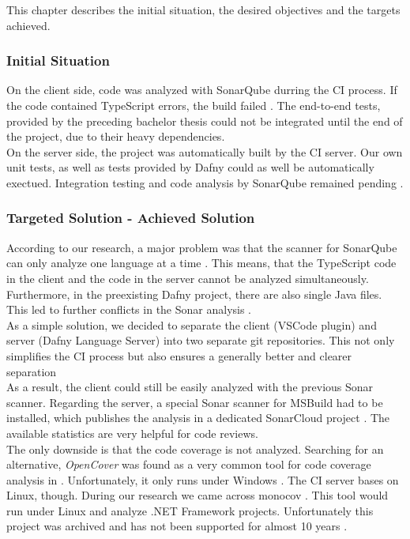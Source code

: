 This chapter describes the initial situation, the desired objectives and the targets achieved.

\subsubsection{Initial Situation}
On the client side, code was analyzed with SonarQube durring the CI process.
If the code contained TypeScript errors, the build failed \cite{sa}.
The end-to-end tests, provided by the preceding bachelor thesis\cite{ba} could not be integrated until the end of the project, due to their heavy dependencies.\\

On the server side, the project was automatically built by the CI server.
Our own unit tests, as well as tests provided by Dafny could as well be automatically exectued.
Integration testing and code analysis by SonarQube remained pending \cite{sa}.

\subsubsection{Targeted Solution - Achieved Solution}
According to our research, a major problem was that the scanner for SonarQube can only analyze one language at a time \cite{sonar-supports-only-one-language}.
This means, that the TypeScript code in the client and the \Csharp code in the server cannot be analyzed simultaneously.
Furthermore, in the preexisting Dafny project, there are also single Java files.
This led to further conflicts in the Sonar analysis \cite{sa}.\\

As a simple solution, we decided to separate the client (VSCode plugin) and server (Dafny Language Server) into two separate git repositories.
This not only simplifies the CI process but also ensures a generally better and clearer separation \\

As a result, the client could still be easily analyzed with the previous Sonar scanner.
Regarding the server, a special Sonar scanner for MSBuild had to be installed, which publishes the analysis in a dedicated SonarCloud project \cite{dev}.
The available statistics are very helpful for code reviews.\\

The only downside is that the code coverage is not analyzed.
Searching for an alternative, \textit{OpenCover} was found as a very common tool for code coverage analysis in \Csharp.
Unfortunately, it only runs under Windows  \cite{opencover}.
The CI server bases on Linux, though.
During our research we came across monocov \cite{monocov}.
This tool would run under Linux and analyze .NET Framework projects.
Unfortunately this project was archived and has not been supported for almost 10 years \cite{monocov}.

